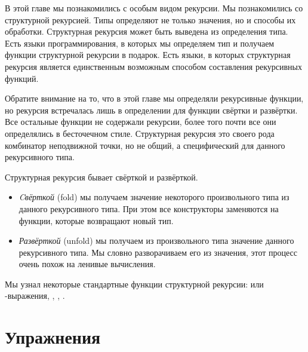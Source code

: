 В этой главе мы познакомились с особым видом рекурсии. 
Мы познакомились со структурной рекурсией. Типы определяют
не только значения, но и способы их обработки. Структурная
рекурсия может быть выведена из определения типа. 
Есть языки программирования, в которых мы определяем тип 
и получаем функции структурной рекурсии в подарок. 
Есть языки, в которых структурная рекурсия является единственным
возможным способом составления рекурсивных функций. 

Обратите внимание на то, что в этой главе мы определяли
рекурсивные функции, но рекурсия встречалась лишь 
в определении для функции свёртки и развёртки. 
Все остальные функции не содержали рекурсии, более того
почти все они определялись в бесточечном стиле.
Структурная рекурсия это своего рода комбинатор 
неподвижной точки, но не общий, а специфический для
данного рекурсивного типа.

Структурная рекурсия бывает свёрткой и развёрткой. 

\begin{itemize}

\item \emph{Cвёрткой} (fold) мы получаем значение некоторого 
произвольного типа из данного рекурсивного типа. 
При этом все конструкторы заменяются на функции, 
которые возвращают новый тип. 

\item \emph{Развёрткой} (unfold) мы получаем из произвольного типа
значение данного рекурсивного типа. Мы словно разворачиваем 
его из значения, этот процесс очень похож на ленивые
вычисления. 

\end{itemize}

Мы узнал некоторые стандартные функции структурной
рекурсии:  или -выражения, ,
, .

\section{Упражнения}


